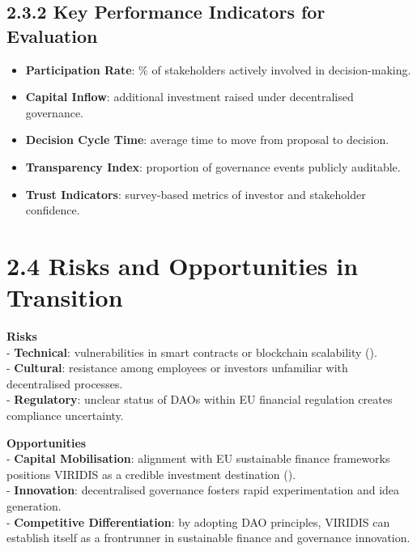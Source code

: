 \documentclass[
  english,
  12pt,
  oneside,
  open=any]{scrbook}
\providecommand{\tightlist}{%
  \setlength{\itemsep}{0pt}\setlength{\parskip}{0pt}}\usepackage{longtable,booktabs,array}
\begin{document}
\subsection{2.3.2 Key Performance Indicators for
Evaluation}\label{sec-kpis}

\begin{itemize}
\tightlist
\item
  \textbf{Participation Rate}: \% of stakeholders actively involved in
  decision-making.\\
\item
  \textbf{Capital Inflow}: additional investment raised under
  decentralised governance.\\
\item
  \textbf{Decision Cycle Time}: average time to move from proposal to
  decision.\\
\item
  \textbf{Transparency Index}: proportion of governance events publicly
  auditable.\\
\item
  \textbf{Trust Indicators}: survey-based metrics of investor and
  stakeholder confidence.
\end{itemize}

\section{2.4 Risks and Opportunities in Transition}\label{sec-risks}

\textbf{Risks}\\
- \textbf{Technical}: vulnerabilities in smart contracts or blockchain
scalability ().\\
- \textbf{Cultural}: resistance among employees or investors unfamiliar
with decentralised processes.\\
- \textbf{Regulatory}: unclear status of DAOs within EU financial
regulation creates compliance uncertainty.

\textbf{Opportunities}\\
- \textbf{Capital Mobilisation}: alignment with EU sustainable finance
frameworks positions VIRIDIS as a credible investment destination
().\\
- \textbf{Innovation}: decentralised governance fosters rapid
experimentation and idea generation.\\
- \textbf{Competitive Differentiation}: by adopting DAO principles,
VIRIDIS can establish itself as a frontrunner in sustainable finance and
governance innovation.
\end{document}

